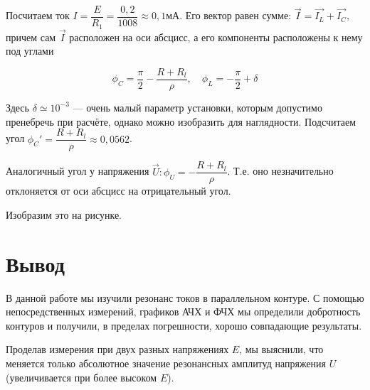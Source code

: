 \documentclass[a4paper, 12pt]{article}
\begin{document}
Посчитаем ток $ I = \dfrac{E}{R_1} = \dfrac{0,2}{1008} \approx 0,1 мА $. Его вектор равен сумме: $ \vec{I} = \vec{I_L} + \vec{I_C} $, причем сам $ \vec{I} $ расположен на оси абсцисс, а его компоненты расположены к нему под углами

\begin{equation}\label{}
\phi_C = \dfrac{\pi}{2} - \dfrac{R + R_l}{\rho}, \quad \phi_L = -\dfrac{\pi}{2} + \delta
\end{equation}

Здесь $ \delta \simeq 10^{-3}$ --- очень малый параметр установки, которым допустимо пренебречь при расчёте, однако можно изобразить для наглядности. Подсчитаем угол $ \phi_C' =   \dfrac{R + R_l}{\rho} \approx 0,0562 $. 

Аналогичный угол у напряжения $ \vec{U}: \phi_U = - \dfrac{R + R_l}{\rho} $. Т.е. оно незначительно отклоняется от оси абсцисс на отрицательный угол.

Изобразим это на рисунке. 

\section{Вывод}

В данной работе мы изучили резонанс токов в параллельном контуре. С помощью непосредственных измерений, графиков АЧХ и ФЧХ мы определили добротность контуров и получили, в пределах погрешности, хорошо совпадающие результаты. 

Проделав измерения при двух разных напряжениях $ E $, мы выяснили, что меняется только абсолютное значение резонансных амплитуд напряжения $ U $ (увеличивается при более высоком $ E $). 
\end{document}
